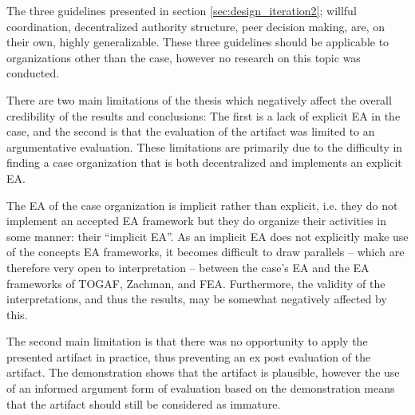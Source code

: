 %
%
%
%
%
%
The three guidelines presented in section \ref{sec:design_iteration2}; willful coordination, decentralized authority structure, peer decision making, are, on their own, highly generalizable. These three guidelines should be applicable to organizations other than the case, however no research on this topic was conducted.

There are two main limitations of the thesis which negatively affect the overall credibility of the results and conclusions: The first is a lack of explicit EA in the case, and the second is that the evaluation of the artifact was limited to an argumentative evaluation. These limitations are primarily due to the difficulty in finding a case organization that is both decentralized and implements an explicit EA. 

The EA of the case organization is implicit rather than explicit, i.e. they do not implement an accepted EA framework but they do organize their activities in some manner: their ``implicit EA''. As an implicit EA does not explicitly make use of the concepts EA frameworks, it becomes difficult to draw parallels -- which are therefore very open to interpretation -- between the case's EA and the EA frameworks of TOGAF, Zachman, and FEA.  Furthermore, the validity of the interpretations, and thus the results, may be somewhat negatively affected by this.

The second main limitation is that there was no opportunity to apply the presented artifact in practice, thus preventing an ex post evaluation of the artifact. The demonstration shows that the artifact is plausible, however the use of an informed argument form of evaluation based on the demonstration means that the artifact should still be considered as immature.

